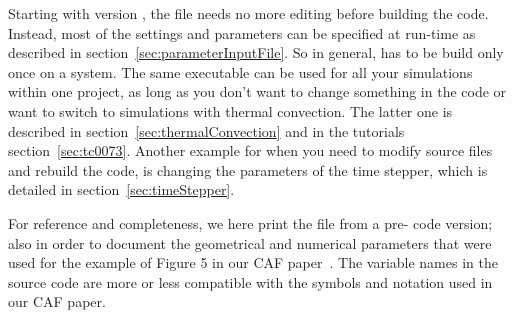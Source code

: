 \documentclass[a4paper, 11pt, DIV=11]{scrartcl}
\begin{document}
Starting with \nsc version , the file  needs
no more editing before building the code. Instead, most of the settings and
parameters can be specified at run-time as described in section~\ref{sec:parameterInputFile}.
So in general, \nsc has to be build only once on a system. The same executable
can be used for all your simulations within one project, as long as you don't
want to change something in the code or want to switch to \eg simulations with
thermal convection. The latter one is described in section~\ref{sec:thermalConvection}
and in the tutorials section~\ref{sec:tc0073}. Another example for when you need to
modify source files and rebuild the code, is changing the parameters of the time
stepper, which is detailed in section~\ref{sec:timeStepper}.
\par
For reference and completeness, we here print the  file
from a pre- code version; also in order to document the geometrical
and numerical parameters that were used for the example of Figure 5 in our CAF
paper~\cite{Shi2015}. The variable names in the source code are more or less
compatible with the symbols and notation used in our CAF paper.
\end{document}
